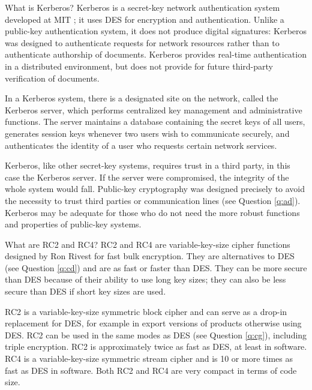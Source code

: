 {What is Kerberos?}
Kerberos is a secret-key network authentication system developed at MIT
\cite{steiner-kerberos}; it uses DES for encryption and authentication.
Unlike a public-key authentication system, it does not produce digital
signatures: Kerberos was designed to authenticate requests for network
resources rather than to authenticate authorship of documents. Kerberos
provides real-time authentication in a distributed environment, but does
not provide for future third-party verification of documents.

In a Kerberos system, there is a designated site on the network, called 
the Kerberos server, which performs centralized key management and 
administrative functions. The server maintains a database containing the 
secret keys of all users, generates session keys whenever two users wish to 
communicate securely, and authenticates the identity of a user who requests 
certain network services. 

Kerberos, like other secret-key systems, requires trust in a third party, 
in this case the Kerberos server. If the server were compromised, the 
integrity of the whole system would fall. Public-key cryptography was 
designed precisely to avoid the necessity to trust third parties or 
communication lines (see Question \ref{q:ad}). Kerberos may be adequate 
for those who do not need the more robust functions and properties of 
public-key systems. 

{What are RC2 and RC4?}
RC2 and RC4 are variable-key-size cipher functions designed by Ron Rivest 
for fast bulk encryption. They are alternatives to DES (see Question
\ref{q:cd}) and are as fast or faster than DES. They can be more secure than 
DES because of their ability to use long key sizes; they can also be less 
secure than DES if short key sizes are used.

RC2 is a variable-key-size symmetric block cipher and can serve as a drop-in
replacement for DES, for example in export versions of products otherwise
using DES. RC2 can be used in the same modes as DES (see Question 
\ref{q:cg}), including triple encryption. RC2 is approximately twice 
as fast as DES, at least in software. RC4 is a variable-key-size symmetric 
stream cipher and is 10 or more times as fast as DES in software. Both RC2 
and RC4 are very compact in terms of code size. 

